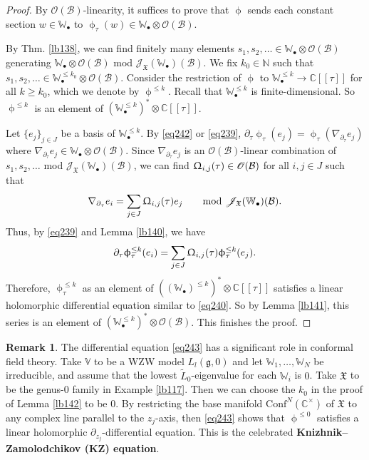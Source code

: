 \documentclass[12pt,a4paper,notitlepage]{article}
\theoremstyle{definition}
\newtheorem{rem}[df]{Remark}
\theoremstyle{plain}
\newcommand{\fk}{\mathfrak}
\newcommand{\mc}{\mathcal}
\newcommand{\wtd}{\widetilde}
\newcommand{\Conf}{\mathrm{Conf}}
\newcommand{\scr}{\mathscr}
\newcommand{\gk}{\mathfrak g}
\newcommand{\blt}{\bullet}
\newcommand{\Vbb}{\mathbb V}
\newcommand{\Wbb}{\mathbb W}
\newcommand{\Cbb}{\mathbb C}
\newcommand{\Nbb}{\mathbb N}
\numberwithin{equation}{section}
\begin{document}
\begin{proof}
By $\scr O(\mc B)$-linearity, it suffices to prove that $\upphi$ sends each constant section $w\in\Wbb_\blt$ to $\upphi_\tau(w)\in\Wbb_\blt\otimes\scr O(\mc B)$.

By Thm. \ref{lb138}, we can find finitely many elements $s_1,s_2,\dots\in\Wbb_\blt\otimes\scr O(\mc B)$ generating $\Wbb_\blt\otimes\scr O(\mc B)$ mod $\scr J_{\fk X}(\Wbb_\blt)(\mc B)$. We fix $k_0\in\Nbb$ such that $s_1,s_2,\dots\in\Wbb_\blt^{\leq k_0}\otimes\scr O(\mc B)$. Consider the restriction of $\upphi$ to $\Wbb_\blt^{\leq k}\rightarrow \Cbb[[\tau]]$ for all $k\geq k_0$, which we denote by $\upphi^{\leq k}$. Recall that $\Wbb_\blt^{\leq k}$ is finite-dimensional.  So $\upphi^{\leq k}$ is an element of $(\Wbb_\blt^{\leq k})^*\otimes\Cbb[[\tau]]$.

Let $\{e_j\}_{j\in J}$ be a basis of $\Wbb_\blt^{\leq k}$. By \eqref{eq242} or \eqref{eq239}, $\partial_\tau\upphi_\tau(e_j)=\upphi_\tau(\nabla_{\partial_\tau} e_j)$ where $\nabla_{\partial_\tau} e_j\in\Wbb_\blt\otimes\scr O(\mc B)$. Since $\nabla_{\partial_\tau} e_j$ is an $\scr O(\mc B)$-linear combination of $s_1,s_2,\dots$ mod $\scr J_{\fk X}(\Wbb_\blt)(\mc B)$, we can find $\Upomega_{i,j}(\tau)\in\scr O(\mc B)$ for all $i,j\in J$ such that
\begin{align*}
\nabla_{\partial_\tau} e_i=\sum_{j\in J}\Upomega_{i,j}(\tau)e_j\qquad\text{mod }\scr J_{\fk X}(\Wbb_\blt)(\mc B).
\end{align*}
Thus, by \eqref{eq239} and Lemma \ref{lb140}, we have
\begin{align}
\partial_\tau\upphi_\tau^{\leq k}(e_i)=\sum_{j\in J}\Upomega_{i,j}(\tau)\upphi_\tau^{\leq k}(e_j).\label{eq243}
\end{align}
Therefore,  $\upphi_\tau^{\leq k}$ as an element of $((\Wbb_\blt)^{\leq k})^*\otimes\Cbb[[\tau]]$ satisfies a linear holomorphic differential equation similar to \eqref{eq240}. So by Lemma \ref{lb141}, this series is an element of $(\Wbb_\blt^{\leq k})^*\otimes\scr O(\mc B)$. This finishes the proof.
\end{proof}



\begin{rem}
The differential equation \eqref{eq243} has a significant role in conformal field theory. Take $\Vbb$ to be a WZW model $L_l(\gk,0)$ and let $\Wbb_1,\dots,\Wbb_N$ be irreducible, and assume that the lowest $\wtd L_0$-eigenvalue for each $\Wbb_i$ is $0$. Take $\fk X$ to be the genus-$0$ family in Example \ref{lb117}. Then we can choose the $k_0$ in the proof of Lemma \ref{lb142} to be $0$. By restricting the base manifold $\Conf^N(\Cbb^\times)$ of $\fk X$ to any complex line parallel to the $z_j$-axis, then \eqref{eq243} shows that $\upphi^{\leq 0}$ satisfies a linear holomorphic $\partial_{z_j}$-differential equation. This is the celebrated \textbf{Knizhnik–Zamolodchikov (KZ) equation}.
\end{rem}
\end{document}
